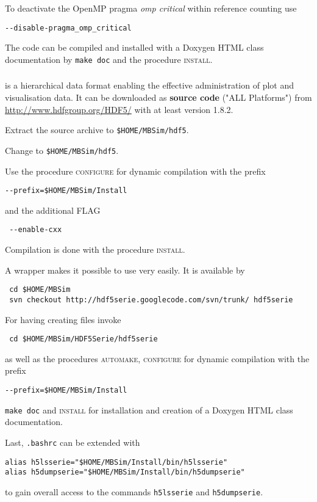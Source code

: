 To deactivate the OpenMP pragma \textit{omp critical} within reference counting use
\begin{verbatim}
--disable-pragma_omp_critical
\end{verbatim}
The code can be compiled and installed with a Doxygen HTML class documentation by \texttt{make doc} and the procedure \textsc{install}.

\subsubsection{\HDF}
\HDF{} is a hierarchical data format enabling the effective administration of plot and visualisation data. It can be downloaded as \textbf{source code} ("ALL Platforms") 
from \url{http://www.hdfgroup.org/HDF5/} with at least version 1.8.2.\par
Extract the source archive to \texttt{\$HOME/MBSim/hdf5}.\par
Change to \texttt{\$HOME/MBSim/hdf5}.\par
Use the procedure \textsc{configure} for dynamic compilation with the prefix
\begin{verbatim}
--prefix=$HOME/MBSim/Install
\end{verbatim}
and the additional FLAG
\begin{verbatim}
 --enable-cxx
\end{verbatim}
Compilation is done with the procedure \textsc{install}.\par
A \HDF{} wrapper makes it possible to use \HDF{} very easily. It is available by
\begin{verbatim}
 cd $HOME/MBSim
 svn checkout http://hdf5serie.googlecode.com/svn/trunk/ hdf5serie
\end{verbatim}
For having \MBSim{} creating \HDF{} files invoke
\begin{verbatim}
 cd $HOME/MBSim/HDF5Serie/hdf5serie
\end{verbatim}
as well as the procedures \textsc{automake, configure} for dynamic compilation with the prefix
\begin{verbatim}
--prefix=$HOME/MBSim/Install
\end{verbatim}
\texttt{make doc} and \textsc{install} for installation and creation of a Doxygen HTML class documentation.\par
Last, \texttt{.bashrc} can be extended with
\begin{verbatim}
alias h5lsserie="$HOME/MBSim/Install/bin/h5lsserie"
alias h5dumpserie="$HOME/MBSim/Install/bin/h5dumpserie"
\end{verbatim}
to gain overall access to the commands \texttt{h5lsserie} and \texttt{h5dumpserie}.

